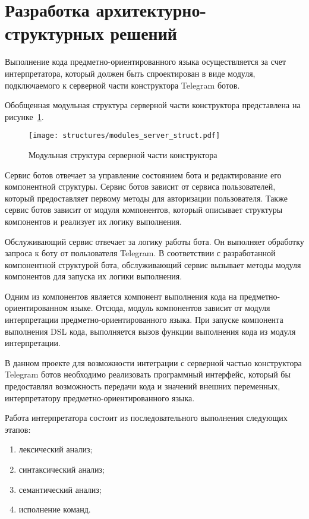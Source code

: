 \newpage

\section{Разработка архитектурно-структурных решений}

Выполнение кода предметно-ориентированного языка осуществляется за счет интерпретатора,
который должен быть спроектирован в виде модуля, подключаемого к серверной части конструктора Telegram ботов.

Обобщенная модульная структура серверной части конструктора представлена на рисунке~\ref{f:modules_server_struct}.

\begin{figure}[ht]
	\centering
	\vspace{\toppaddingoffigure}
	\texttt{[image: structures/modules\_server\_struct.pdf]}
	\caption{Модульная структура серверной части конструктора}
	\label{f:modules_server_struct}
\end{figure}

Сервис ботов отвечает за управление состоянием бота и редактирование его компонентной структуры.
Сервис ботов зависит от сервиса пользователей, который предоставляет первому методы для авторизации пользователя.
Также сервис ботов зависит от модуля компонентов, который описывает структуры компонентов и реализует их логику выполнения.

Обслуживающий сервис отвечает за логику работы бота. 
Он выполняет обработку запроса к боту от пользователя Telegram.
В соответствии с разработанной компонентной структурой бота, обслуживающий сервис вызывает методы модуля компонентов для запуска их логики выполнения.

Одним из компонентов является компонент выполнения кода на предметно-ориентированном языке.
Отсюда, модуль компонентов зависит от модуля интерпретации предметно-ориентированного языка.
При запуске компонента выполнения DSL кода, выполняется вызов функции выполнения кода из модуля интерпретации.

В данном проекте для возможности интеграции с серверной частью конструктора Telegram ботов необходимо реализовать программный интерфейс,
который бы предоставлял возможность передачи кода и значений внешних переменных, интерпретатору предметно-ориентированного языка.

Работа интерпретатора состоит из последовательного выполнения следующих этапов:
\begin{enumerate}
	\item лексический анализ;
	\item синтаксический анализ;
	\item семантический анализ;
	\item исполнение команд.
\end{enumerate}

